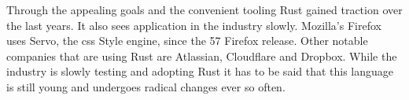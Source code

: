 \documentclass[thesis]{subfiles}
\begin{document}
    Through the appealing goals and the convenient tooling Rust gained traction over the last years.\autocites{so-survey}{rust-org}{rust3}
    It also sees application in the industry slowly.
    Mozilla's Firefox uses Servo, the \gls{css} Style engine, since the 57 Firefox release.\autocite{servo}
    Other notable companies that are using Rust are Atlassian, Cloudflare
    and Dropbox.\autocite{rust-org}
    While the industry is slowly testing and adopting Rust it has to be said that this language is still young and undergoes radical changes ever so often.
\end{document}
